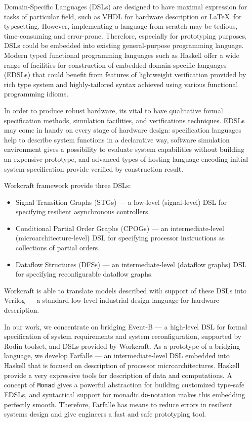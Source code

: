 \documentclass[conference]{IEEEtran}
\begin{document}
Domain-Specific Languages (DSLs) are designed to have maximal expression for
tasks of particular field, such as VHDL for hardware description or \LaTeX~for 
typesetting. However, implementing a language from scratch may be tedious, 
time-consuming and error-prone. Therefore, especially for prototyping purposes, 
DSLs could be embedded into existing general-purpose programming language.
Modern typed functional programming languages such as Haskell offer a wide range
of facilities for construction of embedded domain-specific languages (EDSLs) 
that could benefit from features of lightweight verification provided by rich 
type system and highly-tailored syntax achieved using various functional 
programming idioms.

In order to produce robust hardware, its vital to have qualitative formal
specification methods, simulation facilities, and verifications techniques.
EDSLs may come in handy on every stage of hardware design: specification
languages help to describe system functions in a declarative way, software
simulation environment gives a possibility to evaluate system capabilities
without building an expensive prototype, and advanced types of hosting language
encoding initial system specification provide verified-by-construction result. 

Workcraft framework provide three DSLs: 

\begin{itemize}
\item Signal Transition Graphs (STGs) --- a low-level (signal-level) DSL for 
specifying resilient asynchronous controllers.
\item Conditional Partial Order Graphs (CPOGs) --- an intermediate-level 
(microarchitecture-level) DSL for specifying processor instructions as 
collections of partial orders.
\item Dataflow Structures (DFSs) --- an intermediate-level (dataflow graphs) DSL 
for specifying reconfigurable dataflow graphs.
\end{itemize}

Workcraft is able to translate models described with support of these DSLs into 
Verilog --- a standard low-level industrial design language for hardware 
description.  

In our work, we concentrate on bridging Event-B --- a high-level DSL
for formal specification of system requirements and system reconfiguration, 
supported by Rodin toolset, and DSLs provided by Workcraft. As a 
prototype of a bridging language, we develop Farfalle --- 
an intermediate-level DSL embedded into Haskell that 
is focused on description of processor microarchitectures.
Haskell provide a very expressive tools for description of data and 
computations. A concept of \texttt{Monad} gives a powerful abstraction for 
building customized type-safe EDSLs, and syntactical support for monadic 
\texttt{do}-notation makes this embedding perfectly smooth. Therefore, Farfalle
has means to reduce errors in resilient systems design and give engineers a fast 
and safe prototyping tool.      
\end{document}
